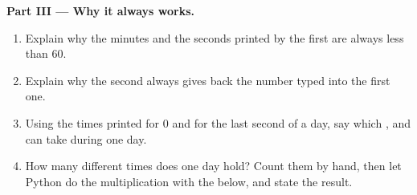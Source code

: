 \begin{problem}
\medskip\noindent\textbf{Part III --- Why it always works.}
\begin{enumerate}[resume]
  \item Explain why the minutes and the seconds printed by the first 
    are always less than 60.
  \item Explain why the second  always gives back the number typed into
    the first one.
  \item Using the times printed for 0 and for the last second of a day, say
    which  ,  and  can take during one day.
  \item How many different  times does one day hold? Count them by
    hand, then let Python do the multiplication with the  below, and
    state the result.
\end{enumerate}

\label{lst:g6:variables-and-input:day}
\end{problem}

